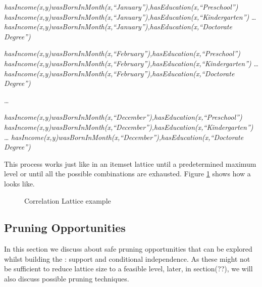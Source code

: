   \emph{hasIncome(x,y)wasBornInMonth(x,``January''),hasEducation(x,``Preschool'')} \newline
  \emph{hasIncome(x,y)wasBornInMonth(x,``January''),hasEducation(x,``Kindergarten'')} \newline
  \dots \newline
  \emph{hasIncome(x,y)wasBornInMonth(x,``January''),hasEducation(x,``Doctorate Degree'')} \newline

  \emph{hasIncome(x,y)wasBornInMonth(x,``February''),hasEducation(x,``Preschool'')} \newline
  \emph{hasIncome(x,y)wasBornInMonth(x,``February''),hasEducation(x,``Kindergarten'')} \newline
  \dots \newline
  \emph{hasIncome(x,y)wasBornInMonth(x,``February''),hasEducation(x,``Doctorate Degree'')} \newline
 
  \dots \newline

  \emph{hasIncome(x,y)wasBornInMonth(x,``December''),hasEducation(x,``Preschool'')} \newline
  \emph{hasIncome(x,y)wasBornInMonth(x,``December''),hasEducation(x,``Kindergarten'')} \newline
  \dots \newline
  \emph{hasIncome(x,y)wasBornInMonth(x,``December''),hasEducation(x,``Doctorate Degree'')} \newline

This process works just like in an itemset lattice until a predetermined maximum level or until all the
possible combinations are exhausted. Figure \ref{fig:lattice} shows how a \graphname looks like.

\begin{figure}[!h]
  \caption{Correlation Lattice example}
  \centering
  
  \label{fig:lattice}
\end{figure}

\subsection{Pruning Opportunities}

In this section we discuss about safe pruning opportunities that can be explored whilst building the \graphname: support
and conditional independence. As these might not be sufficient to reduce lattice size to a feasible level, later, in
section(??), we will also discuss possible pruning techniques.

